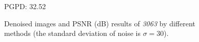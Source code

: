 \begin{figure}[t!]
{\begin{minipage}[t]{0.24\textwidth}
{\footnotesize PGPD: 32.52}
\end{minipage}
}\vspace{-3mm}
    \caption{Denoised images and PSNR (dB) results of \textsl{3063} by different methods (the standard deviation of noise is $\sigma=30$).}
    \label{fig2-14}
\end{figure}


\begin{figure}[ht!]
    \centering
{}
\end{figure}
